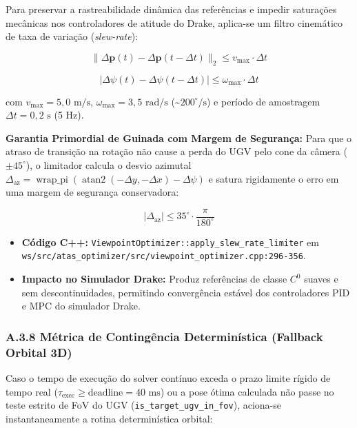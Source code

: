 \documentclass[
  brazilian,
  a4paper]{article}
\providecommand{\tightlist}{%
  \setlength{\itemsep}{0pt}\setlength{\parskip}{0pt}}
\begin{document}
Para preservar a rastreabilidade dinâmica das referências e impedir
saturações mecânicas nos controladores de atitude do Drake, aplica-se um
filtro cinemático de taxa de variação (\emph{slew-rate}):

\[\|\Delta \mathbf{p}(t) - \Delta \mathbf{p}(t - \Delta t)\|_2 \le v_{\text{max}} \cdot \Delta t\]

\[|\Delta \psi(t) - \Delta \psi(t - \Delta t)| \le \omega_{\text{max}} \cdot \Delta t\]

com \(v_{\text{max}} = 5{,}0\text{ m/s}\),
\(\omega_{\text{max}} = 3{,}5\text{ rad/s}\)
(\textasciitilde{}\(200^\circ\text{/s}\)) e período de amostragem
\(\Delta t = 0{,}2\text{ s}\) (5 Hz).

\textbf{Garantia Primordial de Guinada com Margem de Segurança:} Para
que o atraso de transição na rotação não cause a perda do UGV pelo cone
da câmera (\(\pm 45^\circ\)), o limitador calcula o desvio azimutal
\(\Delta_{\text{az}} = \operatorname{wrap\_pi}(\operatorname{atan2}(-\Delta y, -\Delta x) - \Delta \psi)\)
e satura rigidamente o erro em uma margem de segurança conservadora:

\[|\Delta_{\text{az}}| \le 35^\circ \cdot \frac{\pi}{180^\circ}\]

\begin{itemize}
\tightlist
\item
  \textbf{Código C++:}
  \texttt{ViewpointOptimizer:\allowbreak{}:\allowbreak{}apply\_\allowbreak{}slew\_\allowbreak{}rate\_\allowbreak{}limiter} em
  \texttt{ws/\allowbreak{}src/\allowbreak{}atas\_\allowbreak{}optimizer/\allowbreak{}src/\allowbreak{}viewpoint\_\allowbreak{}optimizer.\allowbreak{}cpp:\allowbreak{}296-356}.
\item
  \textbf{Impacto no Simulador Drake:} Produz referências de classe
  \(C^0\) suaves e sem descontinuidades, permitindo convergência estável
  dos controladores PID e MPC do simulador Drake.
\end{itemize}

\subsubsection{A.3.8 Métrica de Contingência Determinística (Fallback
Orbital
3D)}\label{a.3.8-muxe9trica-de-continguxeancia-determinuxedstica-fallback-orbital-3d}

Caso o tempo de execução do solver contínuo exceda o prazo limite rígido
de tempo real
(\(\tau_{\text{exec}} \ge \text{deadline} = 40\text{ ms}\)) ou a pose
ótima calculada não passe no teste estrito de FoV do UGV
(\texttt{is\_\allowbreak{}target\_\allowbreak{}ugv\_\allowbreak{}in\_\allowbreak{}fov}), aciona-se instantaneamente a rotina
determinística orbital:
\end{document}

